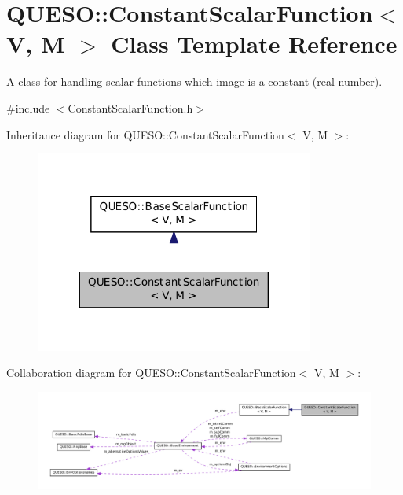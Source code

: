 \hypertarget{class_q_u_e_s_o_1_1_constant_scalar_function}{\section{Q\-U\-E\-S\-O\-:\-:Constant\-Scalar\-Function$<$ V, M $>$ Class Template Reference}
\label{class_q_u_e_s_o_1_1_constant_scalar_function}
}


A class for handling scalar functions which image is a constant (real number).  




{\ttfamily \#include $<$Constant\-Scalar\-Function.\-h$>$}



Inheritance diagram for Q\-U\-E\-S\-O\-:\-:Constant\-Scalar\-Function$<$ V, M $>$\-:
\nopagebreak
\begin{figure}[H]
\begin{center}
\leavevmode
\includegraphics[width=260pt]{class_q_u_e_s_o_1_1_constant_scalar_function__inherit__graph}
\end{center}
\end{figure}


Collaboration diagram for Q\-U\-E\-S\-O\-:\-:Constant\-Scalar\-Function$<$ V, M $>$\-:
\nopagebreak
\begin{figure}[H]
\begin{center}
\leavevmode
\includegraphics[width=350pt]{class_q_u_e_s_o_1_1_constant_scalar_function__coll__graph}
\end{center}
\end{figure}
